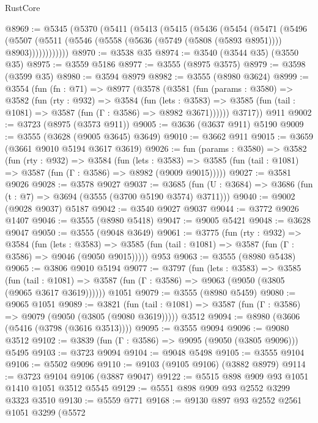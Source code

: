 \begin{lexlean}{RustCore}
\begin{coremodule}
@8969 := @5345
    (@5370
      (@5411
        (@5413
          (@5415
            (@5436
              (@5454
                (@5471
                  (@5496
                    (@5507
                      (@5511 (@5546 (@5558 (@5636 (@5749 (@5808 (@5893 @8951)))) @8903))))))))))))
@8970 := @3538 @35
@8974 := @3540 (@3544 @35) (@3550 @35)
@8975 := @3559 @5186
@8977 := @3555 (@8975 @3575)
@8979 := @3598 (@3599 @35)
@8980 := @3594 @8979
@8982 := @3555 (@8980 @3624)
@8999 := @3554
    (fun (fn : @71) =>
    @8977
      (@3578
        (@3581
          (fun (params : @3580) =>
          @3582
            (fun (rty : @932) =>
            @3584
              (fun (lets : @3583) =>
              @3585 (fun (tail : @1081) => @3587 (fun (Γ : @3586) => @8982 @3671))))))
        @3717))
    @911
@9002 := @3723 (@8975 (@3573 @911))
@9005 := @3636 (@3637 @911) @5190
@9009 := @3555 (@3628 (@9005 @3645) @3649)
@9010 := @3662 @911
@9015 := @3659 (@3661 @9010 @5194 @3617 @3619)
@9026 := fun (params : @3580) =>
  @3582
    (fun (rty : @932) =>
    @3584
      (fun (lets : @3583) =>
      @3585 (fun (tail : @1081) => @3587 (fun (Γ : @3586) => @8982 (@9009 @9015)))))
@9027 := @3581 @9026
@9028 := @3578 @9027
@9037 := @3685 (fun (U : @3684) => @3686 (fun (t : @7) => @3694 (@3555 (@3700 @5190 @3574) @3711)))
@9040 := @9002 (@9028 @9037) @5187
@9042 := @3540 @9027 @9037
@9044 := @3772 @9026 @1407
@9046 := @3555 (@8980 @5418)
@9047 := @9005 @5421
@9048 := @3628 @9047
@9050 := @3555 (@9048 @3649)
@9061 := @3775
    (fun (rty : @932) =>
    @3584
      (fun (lets : @3583) =>
      @3585 (fun (tail : @1081) => @3587 (fun (Γ : @3586) => @9046 (@9050 @9015)))))
    @953
@9063 := @3555 (@8980 @5438)
@9065 := @3806 @9010 @5194
@9077 := @3797
    (fun (lets : @3583) =>
    @3585
      (fun (tail : @1081) => @3587 (fun (Γ : @3586) => @9063 (@9050 (@3805 (@9065 @3617 @3619))))))
    @1051
@9079 := @3555 (@8980 @5459)
@9080 := @9065 @1051
@9089 := @3821
    (fun (tail : @1081) => @3587 (fun (Γ : @3586) => @9079 (@9050 (@3805 (@9080 @3619)))))
    @3512
@9094 := @8980 (@3606 (@5416 (@3798 (@3616 @3513))))
@9095 := @3555 @9094
@9096 := @9080 @3512
@9102 := @3839 (fun (Γ : @3586) => @9095 (@9050 (@3805 @9096))) @5495
@9103 := @3723 @9094
@9104 := @9048 @5498
@9105 := @3555 @9104
@9106 := @5502 @9096
@9110 := @9103 (@9105 @9106) (@3882 @8979)
@9114 := @3723 @9104 @9106 (@3887 @9047)
@9122 := @5515 @898 @909 @93 @1051 @1410 @1051 @3512 @5545
@9129 := @5551 @898 @909 @93 @2552 @3299 @3323 @3510
@9130 := @5559 @771
@9168 := @9130
    @897
    @93
    @2552
    @2561
    @1051
    @3299
    (@5572

\end{coremodule}
\end{lexlean}
